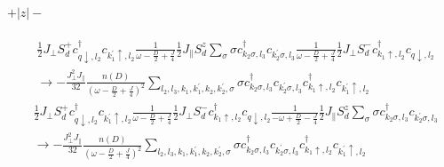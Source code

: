 \documentclass[12pt]{revtex4-2}
\begin{document}
\paragraph{\(+|z|-\)}
\begin{equation}\begin{aligned}
	&\frac{1}{2}J_\perp S_d^+ c^\dagger_{q \downarrow, l_2}c_{k_1^\prime \uparrow, l_2}\frac{1}{\omega - \frac{D}{2} + \frac{J}{4}}\frac{1}{2}J_\parallel S_d^z \sum_\sigma \sigma c^\dagger_{k_2 \sigma, l_3}c_{k_2^\prime \sigma, l_3} \frac{1}{\omega - \frac{D}{2} + \frac{J}{4}} \frac{1}{2}J_\perp S_d^- c^\dagger_{k_1 \uparrow, l_2} c_{q \downarrow, l_2} \\
	&\longrightarrow -\frac{J_\perp^2 J_\parallel}{32} \frac{n(D)}{\left(\omega - \frac{D}{2} + \frac{J}{4}\right)^2}\sum_{l_2, l_3, k_1,k_1^\prime,k_2,k_2^\prime,\sigma}\sigma c^\dagger_{k_2 \sigma, l_3}c_{k_2^\prime \sigma, l_3}c^\dagger_{k_1 \uparrow, l_2}c_{k_1^\prime \uparrow, l_2}
\end{aligned}\end{equation}
\begin{equation}\begin{aligned}
	&\frac{1}{2}J_\perp S_d^+ c^\dagger_{q \downarrow, l_2}c_{k_1^\prime \uparrow, l_2} \frac{1}{\omega - \frac{D}{2} + \frac{J}{4}} \frac{1}{2}J_\perp S_d^- c^\dagger_{k_1 \uparrow, l_2} c_{q \downarrow, l_2} \frac{1}{-\omega + \frac{D}{2} - \frac{J}{4}}\frac{1}{2}J_\parallel S_d^z \sum_\sigma \sigma c^\dagger_{k_2 \sigma, l_3}c_{k_2^\prime \sigma, l_3}\\
	&\longrightarrow -\frac{J_\perp^2 J_\parallel}{32} \frac{n(D)}{\left(\omega - \frac{D}{2} + \frac{J}{4}\right)^2}\sum_{l_2, l_3, k_1,k_1^\prime,k_2,k_2^\prime,\sigma}\sigma c^\dagger_{k_2 \sigma, l_3}c_{k_2^\prime \sigma, l_3}c^\dagger_{k_1 \uparrow, l_2}c_{k_1^\prime \uparrow, l_2}
\end{aligned}\end{equation}
\end{document}
